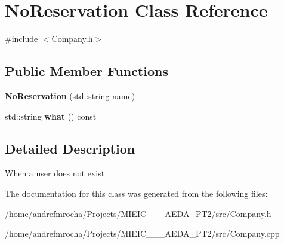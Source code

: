 \hypertarget{class_no_reservation}{}\section{No\+Reservation Class Reference}
\label{class_no_reservation}


{\ttfamily \#include $<$Company.\+h$>$}

\subsection*{Public Member Functions}
\begin{DoxyCompactItemize}
\item 
\mbox{\label{class_no_reservation_a176e966dc45e1011a94e75da18aeb995}} 
{\bfseries No\+Reservation} (std\+::string name)
\item 
\mbox{\label{class_no_reservation_a61b762639f31d431f40285cd32e382fa}} 
std\+::string {\bfseries what} () const
\end{DoxyCompactItemize}


\subsection{Detailed Description}
When a user does not exist 

The documentation for this class was generated from the following files\+:\begin{DoxyCompactItemize}
\item 
/home/andrefmrocha/\+Projects/\+M\+I\+E\+I\+C\+\_\+\_\+\_\+\+A\+E\+D\+A\+\_\+\+P\+T2/src/Company.\+h\item 
/home/andrefmrocha/\+Projects/\+M\+I\+E\+I\+C\+\_\+\_\+\_\+\+A\+E\+D\+A\+\_\+\+P\+T2/src/Company.\+cpp\end{DoxyCompactItemize}
